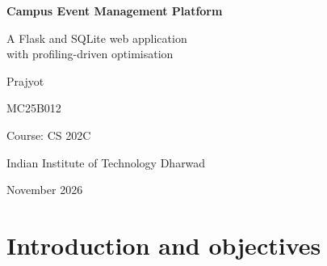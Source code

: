 \documentclass[11pt,a4paper]{article}
\newcommand{\code}[1]{\texttt{\detokenize{#1}}}
\begin{document}
\begin{titlepage}
  \centering
  \vspace*{2.5cm}
  {\Huge\bfseries Campus Event Management Platform\par}
  \vspace{0.6cm}
  {\Large A Flask and SQLite web application\\ with profiling-driven optimisation\par}
  \vspace{2.5cm}
  {\Large Prajyot\par}
  \vspace{0.3cm}
  {\large {MC25B012}\par}
  \vspace{1.5cm}
  {\large Course: CS 202C\par}
  \vspace{0.2cm}
  {\large Indian Institute of Technology Dharwad\par}
  \vfill
  {\large November 2026\par}
\end{titlepage}

\begin{abstract}
This report describes the Campus Event Management Platform, a web application in
which students browse, search and register for campus events and administrators manage
events, venues, participant lists and reports. It is built with Python and Flask, uses
SQLite through raw SQL, is styled with hand-written HTML and CSS, is automated with Bash
scripts and versioned with Git. The application is covered by 45 automated pytest tests.
A deliberately naive first version of the reports page was profiled with \code{cProfile} on
2000 events and 67{,}423 registrations: 99\% of the time was spent in 6000 small SQL
queries (the \emph{N+1 query problem}). Rewriting each report as one \code{JOIN}~+~\code{GROUP BY}
query and adding three indexes reduced the total time from 10.9\,s to 32.6\,ms (about
335$\times$ faster) and the number of SQL statements from 6016 to 6, while the tests
confirmed that every report number stayed the same.
\end{abstract}

\newpage
\tableofcontents
\newpage

\section{Introduction and objectives}
\end{document}

